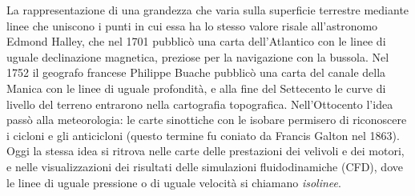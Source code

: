 \begin{notastorica}
La rappresentazione di una grandezza che varia sulla superficie terrestre mediante linee
che uniscono i punti in cui essa ha lo stesso valore risale all'astronomo Edmond Halley,
che nel 1701 pubblicò una carta dell'Atlantico con le linee di uguale declinazione
magnetica, preziose per la navigazione con la bussola. Nel 1752 il geografo francese
Philippe Buache pubblicò una carta del canale della Manica con le linee di uguale
profondità, e alla
fine del Settecento le curve di livello del terreno entrarono nella cartografia
topografica. Nell'Ottocento l'idea passò alla meteorologia: le carte sinottiche con le
isobare permisero di riconoscere i cicloni e gli anticicloni (questo termine fu coniato
da Francis Galton nel 1863). Oggi la stessa idea si ritrova nelle carte delle
prestazioni dei velivoli e dei motori, e nelle visualizzazioni dei risultati delle
simulazioni fluidodinamiche (CFD), dove le linee di uguale pressione o di uguale velocità
si chiamano \emph{isolinee}.
\end{notastorica}
